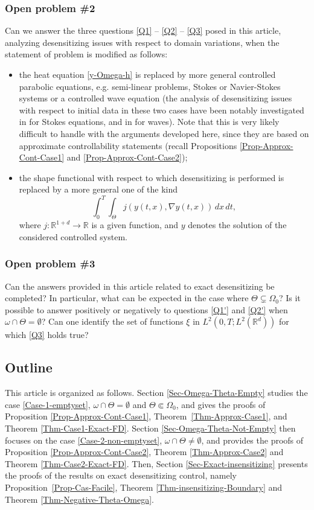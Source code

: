 \documentclass[JEP,XML,SOM,Unicode,NoFloatCountersInSection]{cedram}
\newcounter{question}
\newcommand\R{{\mathbb R}}
\theoremstyle{definition}
\begin{document}
\subsubsection*{Open problem \#{2}} Can we answer the three questions {\ref{Q1} -- \ref{Q2} -- \ref{Q3}} posed in this article, analyzing desensitizing issues with respect to domain variations, when the statement of problem is modified as follows:
\begin{itemize}
\item the heat equation \eqref{y-Omega-h} is replaced by more general controlled parabolic equations, e.g. semi-linear problems, Stokes or Navier-Stokes systems or a controlled wave equation (the analysis of desensitizing issues with respect to initial data in these two cases have been notably investigated in \cite{Guerrero} for Stokes equations, and in \cite{Tebou1,Tebou2,Alabau-Boussouira} for waves). Note that this is very likely difficult to handle with the arguments deve\-loped here, since they are based on approximate controllability statements (recall Propositions \ref{Prop-Approx-Cont-Case1} and \ref{Prop-Approx-Cont-Case2});

\item the shape functional with respect to which desensitizing is performed is replaced by a more general one of the kind
\[
\int_0^T\int_{\Theta}j(y(t,x),\nabla y(t,x))\, dx\,dt,
\]
where $j:\R^{1+d} \to \R$ is a given function, and $y$ denotes the solution of the considered controlled system.
\end{itemize}

\subsubsection*{Open problem \#{3}} Can the answers provided in this article related to exact desensitizing be completed? In particular, what can be expected in the case where $\Theta \subsetneq \Omega_0$? Is it possible to answer positively or negatively to questions \ref{Q1'} and \ref{Q2'} when $\omega \cap \Theta= \emptyset$? Can one identify the set of functions $\xi$ in $L^2(0,T; L^2(\R^d))$ for which \ref{Q3} holds true?

\subsection{Outline}

This article is organized as follows. Section \ref{Sec-Omega-Theta-Empty} studies the case \eqref{Case-1-emptyset}, \ie $\omega \cap \Theta = \emptyset$ and $\Theta \Subset \Omega_0$, and gives the proofs of Proposition \ref{Prop-Approx-Cont-Case1}, Theorem~\ref{Thm-Approx-Case1}, and Theorem \ref{Thm-Case1-Exact-FD}. Section \ref{Sec-Omega-Theta-Not-Empty} then focuses on the case \eqref{Case-2-non-emptyset}, \ie $\omega \cap \Theta \neq \emptyset$, and provides the proofs of Proposition \ref{Prop-Approx-Cont-Case2}, Theorem \ref{Thm-Approx-Case2} and Theorem \ref{Thm-Case2-Exact-FD}. Then, Section \ref{Sec-Exact-insensitizing} presents the proofs of the results on exact desensitizing control, namely Proposition~\ref{Prop-Cas-Facile}, Theorem \ref{Thm-insensitizing-Boundary} and Theorem \ref{Thm-Negative-Theta-Omega}.
\end{document}

